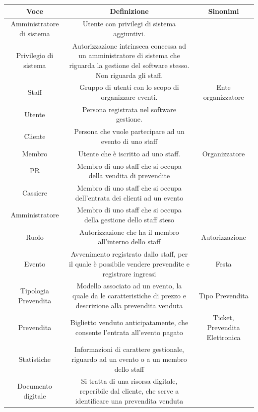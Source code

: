 \documentclass[a4paper]{article}
\begin{document}
\begin{table}[ht!]
  \begin{center}
    \begin{tabulary}{1\textwidth}{c|C|C}
        \textbf{Voce} & \textbf{Definizione} & \textbf{Sinonimi}\\
        \hline
        \hline
		Amministratore di sistema & Utente con privilegi di sistema aggiuntivi. & \\
		\hline
		Privilegio di sistema & Autorizzazione intrinseca concessa ad un amministratore di sistema che riguarda la gestione del software stesso. Non riguarda gli staff. & \\
		\hline
        Staff & Gruppo di utenti con lo scopo di organizzare eventi. & Ente organizzatore \\
        \hline
        Utente & Persona registrata nel software gestione. & \\
        \hline
		Cliente & Persona che vuole partecipare ad un evento di uno staff & \\
		\hline
        Membro & Utente che è iscritto ad uno staff. & Organizzatore \\
        \hline
		PR & Membro di uno staff che si occupa della vendita di prevendite & \\
		\hline
		Cassiere & Membro di uno staff che si occupa dell'entrata dei clienti ad un evento & \\
		\hline
		Amministratore & Membro di uno staff che si occupa della gestione dello staff steso & \\
		\hline
        Ruolo & Autorizzazione che ha il membro all'interno dello staff & Autorizzazione \\
        \hline
        Evento & Avvenimento registrato dallo staff, per il quale è possibile vendere prevendite e registrare ingressi & Festa \\
        \hline
        Tipologia Prevendita & Modello associato ad un evento, la quale da le caratteristiche di prezzo e descrizione alla prevendita venduta & Tipo Prevendita \\
        \hline
        Prevendita & Biglietto venduto anticipatamente, che consente l'entrata all'evento pagato & Ticket, Prevendita Elettronica \\
        \hline
		Statistiche & Informazioni di carattere gestionale, riguardo ad un evento o a un membro dello staff & \\
		\hline
		Documento digitale & Si tratta di una risorsa digitale, reperibile dal cliente, che serve a identificare una prevendita venduta & \\

\end{tabulary}
\end{center}
\end{table}
\end{document}
